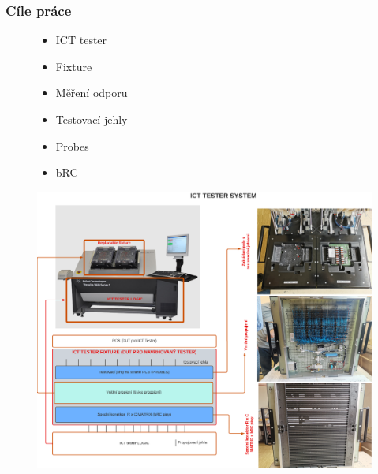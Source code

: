 \documentclass[%
  12pt,       				%
	t,                  %
	aspectratio=1610,   %
	unicode,						%
]{beamer}				    	%
\begin{document}
\disablenavigationsymbols

\maketitle


\begin{frame} 
	\frametitle{Cíle práce}
	\begin{figure}[ht!]
		\centering
		\begin{minipage}{0.3\textwidth}
			\vspace*{-3cm}
			\begin{itemize}
				\item ICT tester
				\item Fixture
				\item Měření odporu
				\item Testovací jehly
				\item Probes
				\item bRC
			\end{itemize}
		\end{minipage}
		\begin{minipage}{0.65\textwidth}
		\includegraphics[height = 0.8\textheight]{obrazky/ICT_tester.png}
		\end{minipage}
	\end{figure}
\end{frame}
\end{document}
